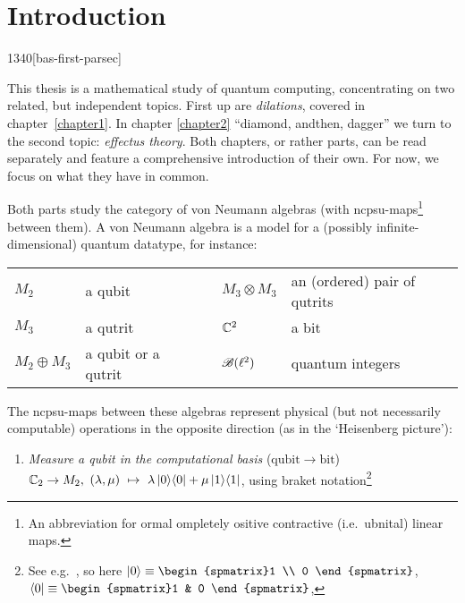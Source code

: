 
\chapter{Introduction}
\begin{parsec}{1340}[bas-first-parsec]%
\begin{point}{10}%
This thesis is a mathematical study of quantum computing, concentrating
    on two related, but independent topics.
First up are \emph{dilations}, covered in chapter~\ref{chapter1}.
    In chapter \ref{chapter2}
    ``diamond, andthen, dagger''
    we turn to the second topic: \emph{effectus theory}.
Both chapters, or rather parts, can be read separately
    and feature a comprehensive introduction of their own.
For now, we focus on what they have in common.
\begin{point}{20}%
Both parts study the category of von Neumann algebras
    (with ncpsu-maps\footnote{%
        An abbreviation for ormal ompletely ositive contractive (i.e.~ubnital) linear maps.} between them).
A von Neumann algebra is a model for a (possibly infinite-dimensional)
    quantum datatype, for instance:
\begin{center}
    \begin{tabular}{lllll}
        $M_2$ & a qubit &\quad\qquad& $M_3 \otimes M_3$ & an (ordered) pair of qutrits \\
        $M_3$ & a qutrit && $\mathbb{C}^2$ & a bit \\
        $M_2 \oplus M_3$ & a qubit or a qutrit &
        & $\mathscr{B}(\ell^2)$ & quantum integers
\end{tabular}
\end{center}
The ncpsu-maps between these algebras represent physical
    (but not necessarily computable) operations
        in the opposite direction
        (as in the `Heisenberg picture'):
\begin{enumerate}
\item
    \emph{Measure a qubit in the computational basis} \quad
            ($\mathrm{qubit} \to \mathrm{bit}$)\\
        $\mathbb{C}_2 \rightarrow M_2,$ \quad 
        $(\lambda,\mu) \ \mapsto\ \lambda \left|0\right>\!\left<0\right| + \mu \left|1\right>\!\left<1\right|$,
        \quad using braket notation\footnote{%
            See e.g.~\cite[fig.~2.1]{nielsen2002quantum},
            so here
            $\ket{0}\equiv\begin{spmatrix}1 \\ 0 \end{spmatrix}$,
            $\bra{0}\equiv\begin{spmatrix}1 & 0 \end{spmatrix}$,
}
\end{enumerate}
\end{point}
\end{point}
\end{parsec}
